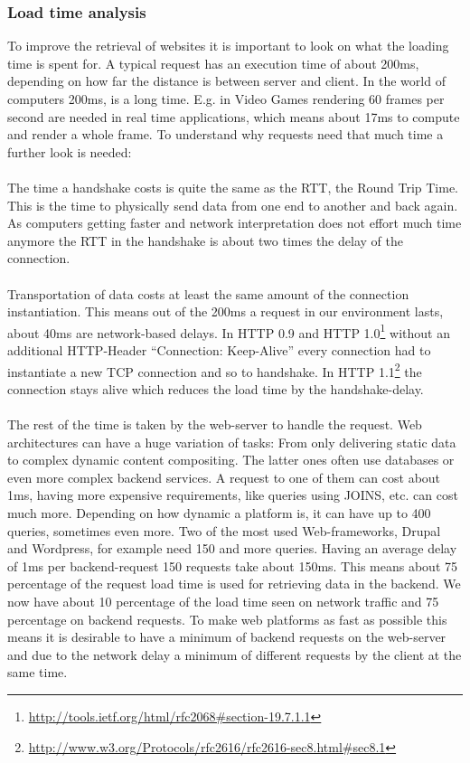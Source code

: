 \documentclass[f,bachelor,binding,twoside,palatino]{WeSTthesis}
\begin{document}
    \subsubsection{Load time analysis\label{httpLoadTime}}
      To improve the retrieval of websites it is important to look on what the loading time is spent for. A typical request has an execution time of about 200ms, depending on how far the distance is between server and client. In the world of computers 200ms, is a long time. E.g. in Video Games rendering 60 frames per second are needed in real time applications, which means about 17ms to compute and render a whole frame. To understand why requests need that much time a further look is needed:\\\\
      The time a handshake costs is quite the same as the RTT, the Round Trip Time. This is the time to physically send data from one end to another and back again.
      As computers getting faster and network interpretation does not effort much time anymore the RTT in the handshake is about two times the delay of the connection.\\\\
      Transportation of data costs at least the same amount of the connection instantiation. This means out of the 200ms a request in our environment lasts, about 40ms are network-based delays. In HTTP 0.9 and HTTP 1.0\footnote{\url{http://tools.ietf.org/html/rfc2068#section-19.7.1.1}} without an additional HTTP-Header \enquote{Connection: Keep-Alive} every connection had to instantiate a new TCP connection and so to handshake. In HTTP 1.1\footnote{\url{http://www.w3.org/Protocols/rfc2616/rfc2616-sec8.html#sec8.1}} the connection stays alive which reduces the load time by the handshake-delay.\\\\
      The rest of the time is taken by the web-server to handle the request. Web architectures can have a huge variation of tasks: From only delivering static data to complex dynamic content compositing. The latter ones often use databases or even more complex backend services. A request to one of them can cost about 1ms, having more expensive requirements, like queries using JOINS, etc. can cost much more.
      Depending on how dynamic a platform is, it can have up to 400 queries, sometimes even more. Two of the most used Web-frameworks, Drupal and Wordpress, for example need 150 and more queries.
      Having an average delay of 1ms per backend-request 150 requests take about 150ms.
      This means about 75 percentage of the request load time is used for retrieving data in the backend.
      We now have about 10 percentage of the load time seen on network traffic and 75 percentage on backend requests. To make web platforms as fast as possible this means it is desirable to have a minimum of backend requests on the web-server and due to the network delay a minimum of different requests by the client at the same time.
\end{document}
